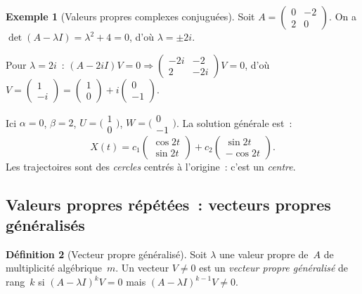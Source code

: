 \documentclass[12pt,a4paper,openany]{book}
\theoremstyle{definition}
\newtheorem{definition}{Définition}[chapter]
\newtheorem{exemple}[definition]{Exemple}
\theoremstyle{plain}
\theoremstyle{remark}
\begin{document}
\begin{exemple}[Valeurs propres complexes conjuguées]\label{ex:vp-complexes}
  Soit $A = \begin{pmatrix} 0 & -2 \\ 2 & 0 \end{pmatrix}$.
  On a $\det(A - \lambda I) = \lambda^2 + 4 = 0$, d'où
  $\lambda = \pm 2i$.

  Pour $\lambda = 2i$~: $(A - 2iI)V = 0 \Rightarrow
  \begin{pmatrix} -2i & -2 \\ 2 & -2i \end{pmatrix}V = 0$,
  d'où $V = \begin{pmatrix} 1 \\ -i \end{pmatrix}
  = \begin{pmatrix} 1 \\ 0 \end{pmatrix}
    + i\begin{pmatrix} 0 \\ -1 \end{pmatrix}$.

  Ici $\alpha = 0$, $\beta = 2$, $U = \bigl(\begin{smallmatrix}1\\0\end{smallmatrix}\bigr)$,
  $W = \bigl(\begin{smallmatrix}0\\-1\end{smallmatrix}\bigr)$.
  La solution générale est~:
  \[
    X(t) = c_1 \begin{pmatrix} \cos 2t \\ \sin 2t \end{pmatrix}
         + c_2 \begin{pmatrix} \sin 2t \\ -\cos 2t \end{pmatrix}.
  \]
  Les trajectoires sont des \emph{cercles} centrés à l'origine~: c'est un \emph{centre}.
\end{exemple}

\subsection{Valeurs propres répétées~: vecteurs propres généralisés}\label{subsec:vp-repetees}

\begin{definition}[Vecteur propre généralisé]\label{def:vecteur-propre-gen}
  Soit $\lambda$ une valeur propre de~$A$ de multiplicité algébrique~$m$.
  Un vecteur $V \neq 0$ est un \emph{vecteur propre généralisé} de rang~$k$
  si $(A - \lambda I)^k V = 0$ mais $(A - \lambda I)^{k-1} V \neq 0$.
\end{definition}
\end{document}
